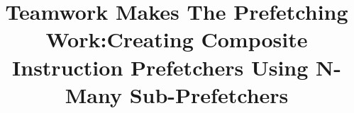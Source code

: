 \documentclass{sig-alternate}
\title{Teamwork Makes The Prefetching Work:Creating Composite Instruction Prefetchers Using N-Many Sub-Prefetchers}
\author{}
\begin{document}
\maketitle

\thispagestyle{firstpage}
\pagestyle{plain}

\begin{spacing}{1}












\end{spacing}









\end{document}
